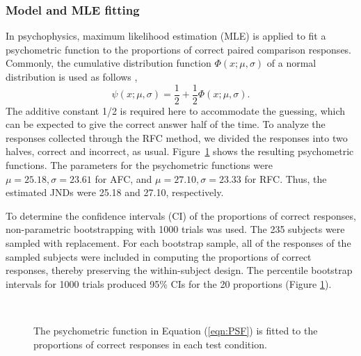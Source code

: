 \documentclass[a4paper,conference]{IEEEtran}
\begin{document}
\subsubsection{Model and MLE fitting}
\label{model_fit}
In psychophysics, maximum likelihood estimation (MLE) is applied to fit a psychometric function to the proportions of correct paired comparison responses. Commonly, the cumulative distribution function $\Phi(x; \mu, \sigma)$ of a normal distribution is used as follows \cite{prins2016Psychophysik},
\begin{equation}
\label{eqn:PSF}
 \psi(x;\mu, \sigma) = \frac{1}{2} + \frac{1}{2} \Phi(x; \mu, \sigma).
\end{equation}
The additive constant 1/2 is required here to accommodate the guessing, which can be expected to give the correct answer half of the time.
To analyze the responses collected through the RFC method, we divided the  responses into two halves, correct and incorrect, as usual. Figure~\ref{fig:fitting} shows the resulting psychometric functions.
The parameters for the psychometric functions were $\mu = 25.18, \sigma = 23.61$ for AFC, and $\mu = 27.10, \sigma = 23.33$ for RFC. Thus, the estimated JNDs were 25.18 and 27.10, respectively.

To determine the confidence intervals (CI) of the proportions of correct responses, non-parametric bootstrapping with 1000 trials was used. The 235 subjects were sampled with replacement. For each bootstrap sample, all of the responses of the sampled subjects were included in computing the proportions of correct responses, thereby preserving the within-subject design. The percentile bootstrap intervals for 1000 trials produced 95\% CIs for the 20 proportions (Figure \ref{fig:fitting}).

 
\begin{figure}[tp!]
\centering
\begin{minipage}{0.95\linewidth}
\\
\centering
\end{minipage} 
\vspace{-10pt}
\caption{The psychometric function in Equation (\ref{eqn:PSF}) is fitted to the proportions of correct responses in each test condition.}
\label{fig:fitting}
\end{figure}
\end{document}
